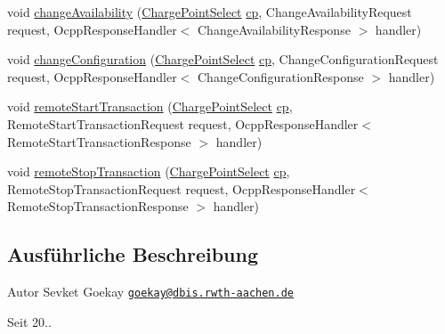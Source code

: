 \begin{DoxyCompactItemize}
\item 
void \hyperlink{interfacede_1_1rwth_1_1idsg_1_1steve_1_1ocpp_1_1_charge_point_service12___invoker_ae1f9ecd4dbcd9a6f74afa0b9e00ecfed}{change\+Availability} (\hyperlink{classde_1_1rwth_1_1idsg_1_1steve_1_1repository_1_1dto_1_1_charge_point_select}{Charge\+Point\+Select} \hyperlink{get_transaction_ids_8js_a02fb69feb56940fd46d72ea6a60e511f}{cp}, Change\+Availability\+Request request, Ocpp\+Response\+Handler$<$ Change\+Availability\+Response $>$ handler)
\item 
void \hyperlink{interfacede_1_1rwth_1_1idsg_1_1steve_1_1ocpp_1_1_charge_point_service12___invoker_a0285980099377e7809157ae2954b48ea}{change\+Configuration} (\hyperlink{classde_1_1rwth_1_1idsg_1_1steve_1_1repository_1_1dto_1_1_charge_point_select}{Charge\+Point\+Select} \hyperlink{get_transaction_ids_8js_a02fb69feb56940fd46d72ea6a60e511f}{cp}, Change\+Configuration\+Request request, Ocpp\+Response\+Handler$<$ Change\+Configuration\+Response $>$ handler)
\item 
void \hyperlink{interfacede_1_1rwth_1_1idsg_1_1steve_1_1ocpp_1_1_charge_point_service12___invoker_a1d7403c93e91272adfa16d250c836523}{remote\+Start\+Transaction} (\hyperlink{classde_1_1rwth_1_1idsg_1_1steve_1_1repository_1_1dto_1_1_charge_point_select}{Charge\+Point\+Select} \hyperlink{get_transaction_ids_8js_a02fb69feb56940fd46d72ea6a60e511f}{cp}, Remote\+Start\+Transaction\+Request request, Ocpp\+Response\+Handler$<$ Remote\+Start\+Transaction\+Response $>$ handler)
\item 
void \hyperlink{interfacede_1_1rwth_1_1idsg_1_1steve_1_1ocpp_1_1_charge_point_service12___invoker_a4fdc6e02e0d797ee8ea2aae5a16ca87a}{remote\+Stop\+Transaction} (\hyperlink{classde_1_1rwth_1_1idsg_1_1steve_1_1repository_1_1dto_1_1_charge_point_select}{Charge\+Point\+Select} \hyperlink{get_transaction_ids_8js_a02fb69feb56940fd46d72ea6a60e511f}{cp}, Remote\+Stop\+Transaction\+Request request, Ocpp\+Response\+Handler$<$ Remote\+Stop\+Transaction\+Response $>$ handler)
\end{DoxyCompactItemize}


\subsection{Ausführliche Beschreibung}
\begin{DoxyAuthor}{Autor}
Sevket Goekay \href{mailto:goekay@dbis.rwth-aachen.de}{\tt goekay@dbis.\+rwth-\/aachen.\+de} 
\end{DoxyAuthor}
\begin{DoxySince}{Seit}
20.. 
\end{DoxySince}


